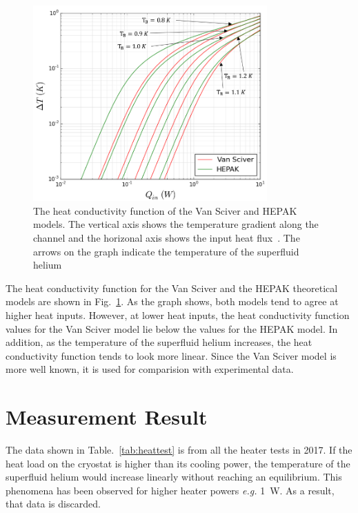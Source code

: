 \begin{figure}[h!]
  \centering \includegraphics[width=0.8\textwidth]{VanSciver_vs_HEPAK.png}
  \caption[The heat conductivity function of the Van Sciver and HEPAK
  models]{The heat conductivity function of the Van Sciver and HEPAK
    models. The vertical axis shows the temperature gradient along the
    channel and the horizonal axis shows the input heat
    flux~\cite{Florian_thesis}. The arrows on the graph indicate the
    temperature of the superfluid helium}
\label{fig:VanSciver_vs_HEPAK}
\end{figure}

The heat conductivity function for the Van Sciver and the HEPAK
theoretical models are shown in Fig.~\ref{fig:VanSciver_vs_HEPAK}. As
the graph shows, both models tend to agree at higher heat
inputs. However, at lower heat inputs, the heat conductivity function
values for the Van Sciver model lie below the values for the HEPAK
model. In addition, as the temperature of the superfluid helium
increases, the heat conductivity function tends to look more
linear. Since the Van Sciver model is more well known, it is used for
comparision with experimental data.

\section{Measurement Result}
The data shown in Table.~\ref{tab:heattest} is from all the heater
tests in 2017. If the heat load on the cryostat is higher than its
cooling power, the temperature of the superfluid helium would increase
linearly without reaching an equilibrium. This phenomena has been
observed for higher heater powers {\it{e.g.}} 1~W. As a result, that
data is discarded.


